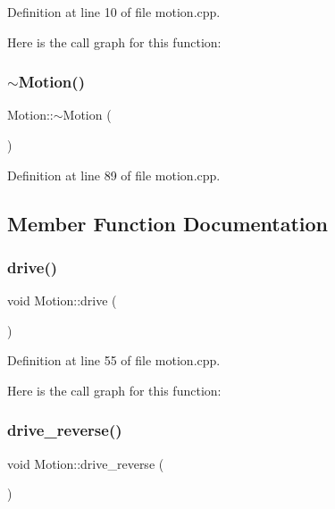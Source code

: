 Definition at line 10 of file motion.\+cpp.

Here is the call graph for this function\+:
\mbox{\label{class_motion_a3989871f9b2b9b69c88b5437b40a72c6}} 
\subsubsection{\texorpdfstring{$\sim$\+Motion()}{~Motion()}}
{\footnotesize\ttfamily Motion\+::$\sim$\+Motion (\begin{DoxyParamCaption}{ }\end{DoxyParamCaption})}



Definition at line 89 of file motion.\+cpp.



\subsection{Member Function Documentation}
\mbox{\label{class_motion_a343e5cef901d8309b64735b3a0923728}} 
\subsubsection{\texorpdfstring{drive()}{drive()}}
{\footnotesize\ttfamily void Motion\+::drive (\begin{DoxyParamCaption}{ }\end{DoxyParamCaption})}



Definition at line 55 of file motion.\+cpp.

Here is the call graph for this function\+:
\mbox{\label{class_motion_a3bc12224ab575f75c71054d547ae0add}} 
\subsubsection{\texorpdfstring{drive\+\_\+reverse()}{drive\_reverse()}}
{\footnotesize\ttfamily void Motion\+::drive\+\_\+reverse (\begin{DoxyParamCaption}{ }\end{DoxyParamCaption})}



